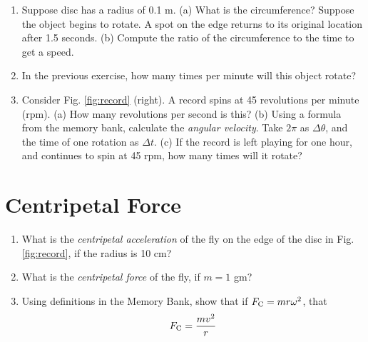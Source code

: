 \documentclass{article}
\begin{document}
\begin{enumerate}
\item Suppose disc has a radius of 0.1 m. (a) What is the circumference?  Suppose the object begins to rotate.  A spot on the edge returns to its original location after 1.5 seconds.  (b) Compute the ratio of the circumference to the time to get a speed.  \\ \vspace{1cm}
\item In the previous exercise, how many times per minute will this object rotate? \\ \vspace{2cm}
\item Consider Fig. \ref{fig:record} (right).  A record spins at 45 revolutions per minute (rpm).  (a) How many revolutions per second is this? (b) Using a formula from the memory bank, calculate the \textit{angular velocity}.  Take $2\pi$ as $\Delta \theta$, and the time of one rotation as $\Delta t$.  (c) If the record is left playing for one hour, and continues to spin at 45 rpm, how many times will it rotate? \\ \vspace{2cm}
\end{enumerate}

\section{Centripetal Force}

\begin{enumerate}
\item What is the \textit{centripetal acceleration} of the fly on the edge of the disc in Fig. \ref{fig:record}, if the radius is 10 cm? \\ \vspace{2cm}
\item What is the \textit{centripetal force} of the fly, if $m=1$ gm? \\ \vspace{2cm}
\item Using definitions in the Memory Bank, show that if $F_{\rm C} = m r \omega^2$, that
\begin{equation}
F_{\rm C} = \frac{mv^2}{r}
\end{equation}
\end{enumerate}
\end{document}
